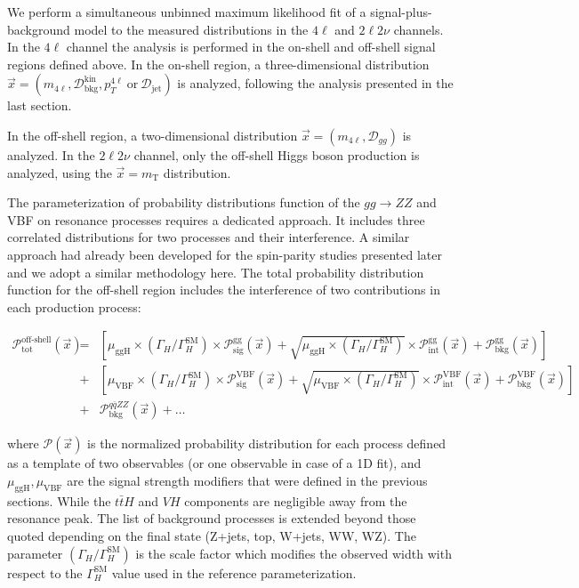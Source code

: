 We perform a simultaneous unbinned maximum likelihood fit of a signal-plus-background model
to the measured distributions in the $4\ell$ and $2\ell2\nu$ channels. In the $4\ell$ channel
the analysis is performed in the on-shell and off-shell signal regions defined above. In the
on-shell region, a three-dimensional distribution
$\vec{x}= (m_{4\ell}, \mathcal{D}_\text{bkg}^\text{kin}, p_{T}^{4\ell}\ \text{or}\ \mathcal{D}_\text{jet})$
is analyzed, following the analysis presented in the last section.

In the off-shell region, a two-dimensional distribution $\vec{x}=(m_{4\ell}, \mathcal{D}_{gg})$
is analyzed. In the $2\ell2\nu$ channel, only the off-shell Higgs boson production is analyzed,
using the $\vec{x}=m_\mathrm{T}$ distribution.

The parameterization of probability distributions function of the $gg\to ZZ$ and VBF on resonance processes requires a dedicated 
approach. It includes three correlated distributions for two processes and their interference. A similar 
approach had already been developed for the spin-parity studies presented later and we adopt a similar methodology here. The total probability distribution function for the off-shell region includes the interference of two
contributions in each production process:
 
 \begin{eqnarray}
 \mathcal{P}_\text{tot}^\text{off-shell}(\vec{x})  &=&
\left[\mu_{\text{ggH}}\times\left(\Gamma_{H}/\Gamma_{H}^{\textrm{SM}}\right) \times \mathcal{P}^{\text{gg}}_\text{sig}\left(\vec{x}\right) +  \sqrt{\mu_{\text{ggH}}\times\left(\Gamma_{H}/\Gamma_{H}^{\textrm{SM}}\right)} \times  \mathcal{P}^{\text{gg}}_\text{int}(\vec{x})+ \mathcal{P}^{\text{gg}}_\text{bkg}(\vec{x}) \right] \nonumber \\
  &+& \left[\mu_{\text{VBF}}\times\left(\Gamma_{H}/\Gamma_{H}^{\textrm{SM}}\right) \times \mathcal{P}^{\text{VBF}}_\text{sig}\left(\vec{x}\right) +  \sqrt{\mu_{\text{VBF}}\times\left(\Gamma_{H}/\Gamma_{H}^{\textrm{SM}}\right)} \times  \mathcal{P}^{\text{VBF}}_\text{int}(\vec{x})+ \mathcal{P}^{\text{VBF}}_\text{bkg}(\vec{x}) \right] \nonumber \\
  &+& \mathcal{P}^{q\bar{q}ZZ}_\text{bkg}(\vec{x}) + \ldots
\label{eq:pdf-prob-vbf}
\end{eqnarray}

where $\mathcal{P}\left(\vec{x}\right)$ is the normalized probability distribution for each process
defined as a template of two observables (or one observable in case of a 1D fit), and $\mu_{\text{ggH}}, \mu_{\text{VBF}}$ are the signal strength modifiers that were defined in the previous sections. While the $t\bar{t}H$ and $VH$ components are negligible away from the resonance peak. The list of background processes is extended beyond those quoted depending on the final state (Z+jets, top, W+jets, WW, WZ). The parameter $(\Gamma_{H}/\Gamma_{H}^{\text{SM}})$ is the scale factor which modifies the observed width with respect to the $\Gamma_{H}^{\text{SM}}$ value used in the reference parameterization.

